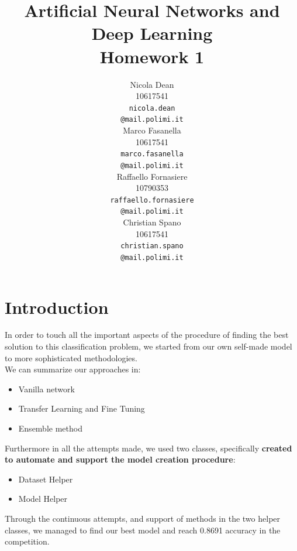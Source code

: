 \documentclass[10pt]{article}
\title{Artificial Neural Networks and Deep Learning \\
Homework 1}
\author{
  Nicola Dean \\
  10617541 \\
  {\tt nicola.dean \\
  \tt @mail.polimi.it} \\\And
  Marco Fasanella \\
  10617541 \\
  {\tt marco.fasanella \\
  \tt @mail.polimi.it} \\\And
  Raffaello Fornasiere \\
    10790353 \\
    {\tt raffaello.fornasiere \\
    \tt @mail.polimi.it} \\\And
  Christian Spano \\
  10617541 \\
  {\tt christian.spano \\
  \tt @mail.polimi.it} \\}
\date{}
\begin{document}
\maketitle



\section{Introduction}
In order to touch all the important aspects of the procedure of finding the best solution to this classification problem,
we started from our own self-made model to more sophisticated methodologies.\\
 We can summarize our approaches in:
\begin{itemize}
  \item Vanilla network
  \item Transfer Learning and Fine Tuning
  \item Ensemble method
\end{itemize}
Furthermore in all the attempts made, we used two classes, specifically \textbf{created to automate and support the model creation
procedure}:
\begin{itemize}
  \item Dataset Helper
  \item Model Helper
\end{itemize}
Through the continuous attempts, and support of methods in the two helper classes, we managed to find our best model and
reach 0.8691 accuracy in the competition.
\end{document}
